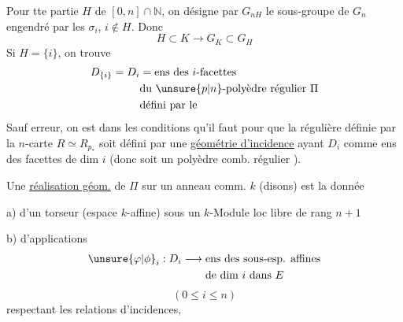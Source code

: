 Pour tte partie $H$ de  $[0,n]\cap\mathbb{N}$, on désigne par $G_{nH}$ le sous-groupe de $G_n$ engendré par les $\sigma_i$, $i\notin H$. Donc
\[
H\subset K\longrightarrow G_K\subset G_H
\]
Si $H=\{i\}$, on trouve
\[
\begin{aligned}
D_{\{i\}}=D_i&=\text{ens des }i\text{-facettes}\\
&\text{du }\unsure{p|n}\text{-polyèdre régulier }\Pi\\
&\text{défini par le}
\end{aligned}
\]
Sauf erreur, on est dans les conditions qu'il faut pour que la  régulière définie par la $n$-carte $R\simeq R_{p_*}$ soit défini par une \uline{géométrie d'incidence} ayant  $D_i$ comme ens des facettes de dim $i$ (donc soit un polyèdre comb. régulier \inserted{$\Pi$}).

Une \uline{réalisation géom.}  de $\Pi$  sur un  anneau comm. $k$ (disons) est la donnée

a) d'un torseur (espace $k$-affine)  sous un $k$-Module loc libre de rang $n+1$

b) d'applications
\[
\begin{aligned}
\unsure{\varphi|\phi}_i:D_i\longrightarrow{}&\text{ens des sous-esp. affines}\\
&\text{de dim }i\text{ dans }E
\end{aligned}
\]
\[
(0\leq i\leq n)
\]
respectant les relations d'incidences,


 
 

